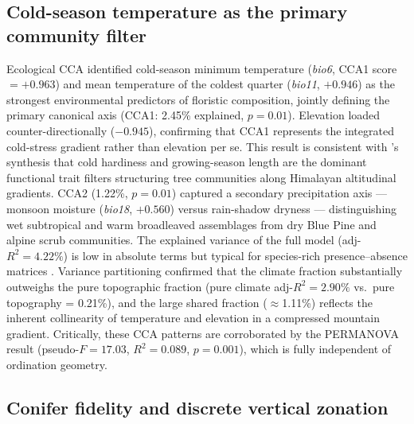 \documentclass[review,12pt,a4paper]{elsarticle}
\begin{document}
\subsection{Cold-season temperature as the primary community filter}
\label{sec:disc_cca}

Ecological CCA identified cold-season minimum temperature
(\textit{bio6}, CCA1 score $= +0.963$) and mean temperature of the coldest
quarter (\textit{bio11}, $+0.946$) as the strongest environmental predictors
of floristic composition, jointly defining the primary canonical axis (CCA1:
2.45\% explained, $p = 0.01$). Elevation loaded counter-directionally
($-0.945$), confirming that CCA1 represents the integrated cold-stress
gradient rather than elevation per se. This result is consistent with
\citeauthor{korner2012}'s \citeyearpar{korner2012} synthesis that cold
hardiness and growing-season length are the dominant functional trait filters
structuring tree communities along Himalayan altitudinal gradients. CCA2
(1.22\%, $p = 0.01$) captured a secondary precipitation axis --- monsoon
moisture (\textit{bio18}, $+0.560$) versus rain-shadow dryness ---
distinguishing wet subtropical and warm broadleaved assemblages from dry Blue
Pine and alpine scrub communities. The explained variance of the full model
(adj-$R^2 = 4.22\%$) is low in absolute terms but typical for species-rich
presence--absence matrices \citep{legendre2012}. Variance partitioning
confirmed that the climate fraction substantially outweighs the pure
topographic fraction (pure climate adj-$R^2 = 2.90\%$ vs.\ pure
topography = 0.21\%), and the large shared fraction ($\approx$1.11\%) reflects
the inherent collinearity of temperature and elevation in a compressed mountain
gradient. Critically, these CCA patterns are corroborated by the PERMANOVA
result (pseudo-$F = 17.03$, $R^2 = 0.089$, $p = 0.001$), which is fully
independent of ordination geometry.

\subsection{Conifer fidelity and discrete vertical zonation}
\label{sec:disc_indicator}
\end{document}
